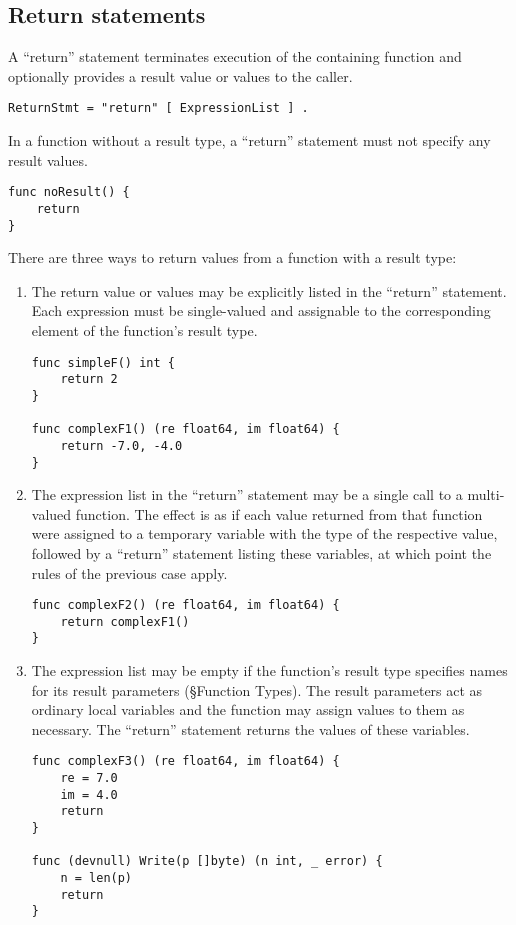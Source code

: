 \subsection*{Return statements}

A ``return'' statement terminates execution of the containing function
and optionally provides a result value or values to the caller.

\begin{Verbatim}[frame=single]
ReturnStmt = "return" [ ExpressionList ] .
\end{Verbatim}

In a function without a result type, a ``return'' statement must not
specify any result values.

\begin{Verbatim}[frame=single]
func noResult() {
    return
}
\end{Verbatim}

There are three ways to return values from a function with a result
type:

\begin{enumerate}
\item
  The return value or values may be explicitly listed in the ``return''
  statement. Each expression must be single-valued and
  assignable to the corresponding element of
  the function's result type.

\begin{Verbatim}[frame=single]
func simpleF() int {
    return 2
}

func complexF1() (re float64, im float64) {
    return -7.0, -4.0
}
\end{Verbatim}
\item
  The expression list in the ``return'' statement may be a single call
  to a multi-valued function. The effect is as if each value returned
  from that function were assigned to a temporary variable with the type
  of the respective value, followed by a ``return'' statement listing
  these variables, at which point the rules of the previous case apply.

\begin{Verbatim}[frame=single]
func complexF2() (re float64, im float64) {
    return complexF1()
}
\end{Verbatim}
\item
  The expression list may be empty if the function's result type
  specifies names for its result parameters
  (§Function Types). The result parameters
  act as ordinary local variables and the function may assign values to
  them as necessary. The ``return'' statement returns the values of
  these variables.

\begin{Verbatim}[frame=single]
func complexF3() (re float64, im float64) {
    re = 7.0
    im = 4.0
    return
}

func (devnull) Write(p []byte) (n int, _ error) {
    n = len(p)
    return
}
\end{Verbatim}
\end{enumerate}

